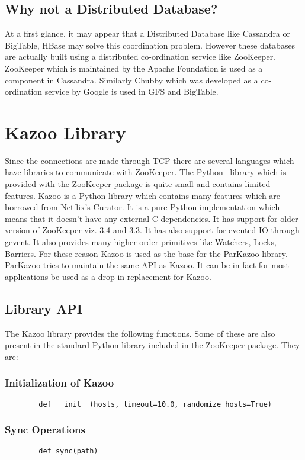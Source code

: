 \subsection{Why not a Distributed Database?}
At a first glance, it may appear that a Distributed Database like Cassandra or BigTable, HBase may solve this coordination problem. However these databases are actually built using a distributed co-ordination service like ZooKeeper. ZooKeeper which is maintained by the Apache Foundation is used as a component in Cassandra. Similarly Chubby which was developed as a co-ordination service by Google is used in GFS and BigTable.

\section{Kazoo Library}
Since the connections are made through TCP there are several languages which have libraries to communicate with ZooKeeper. The Python~\cite{van2002python} library which is provided with the ZooKeeper package is quite small and contains limited features. Kazoo is a Python library which contains many features which are borrowed from Netflix's Curator. It is a pure Python implementation which means that it doesn't have any external C dependencies. It has support for older version of ZooKeeper viz. 3.4 and 3.3. It has also support for evented IO through gevent. It also provides many higher order primitives like Watchers, Locks, Barriers. For these reason Kazoo is used as the base for the ParKazoo library. ParKazoo tries to maintain the same API as Kazoo. It can be in fact for most applications be used as a drop-in replacement for Kazoo.

\subsection{Library API}
The Kazoo library provides the following functions. Some of these are also present in the standard Python library included in the ZooKeeper package. They are:
  \subsubsection{Initialization of Kazoo}
  	\begin{lstlisting}
  		def __init__(hosts, timeout=10.0, randomize_hosts=True)
  	\end{lstlisting}

  \subsubsection{Sync Operations}
  	\begin{lstlisting}
  		def sync(path)
  	\end{lstlisting}

